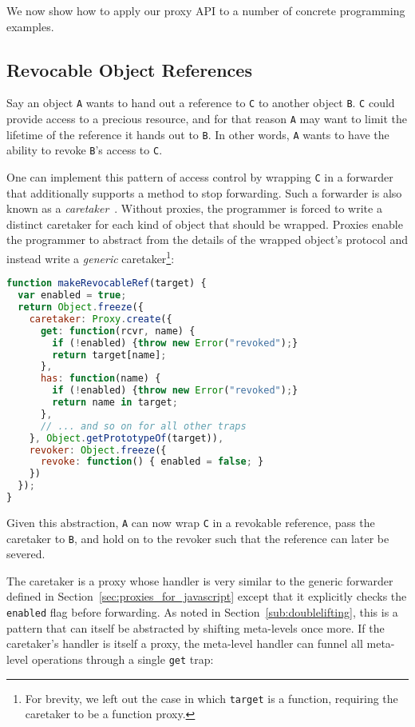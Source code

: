 \documentclass{acm_proc_article-sp}
\begin{document}
We now show how to apply our proxy API to a number of concrete programming examples.

\subsection{Revocable Object References}
\label{sub:revoker}

Say an object \texttt{A} wants to hand out a reference to \texttt{C} to another object \texttt{B}. \texttt{C} could provide access to a precious resource, and for that reason \texttt{A} may want to limit the lifetime of the reference it hands out to \texttt{B}. In other words, \texttt{A} wants to have the ability to revoke \texttt{B}'s access to \texttt{C}.

One can implement this pattern of access control by wrapping \texttt{C} in a forwarder that additionally supports a method to stop forwarding. Such a forwarder is also known as a \emph{caretaker}~\cite{robust_composition}. Without proxies, the programmer is forced to write a distinct caretaker for each kind of object that should be wrapped. Proxies enable the programmer to abstract from the details of the wrapped object's protocol and instead write a \emph{generic} caretaker\footnote{For brevity, we left out the case in which \texttt{target} is a function, requiring the caretaker to be a function proxy.}:

\begin{lstlisting}[language=javascript]
function makeRevocableRef(target) {
  var enabled = true;
  return Object.freeze({
    caretaker: Proxy.create({
      get: function(rcvr, name) {
        if (!enabled) {throw new Error("revoked");}
        return target[name];
      },
      has: function(name) {
        if (!enabled) {throw new Error("revoked");}
        return name in target;      
      },
      // ... and so on for all other traps
    }, Object.getPrototypeOf(target)),
    revoker: Object.freeze({
      revoke: function() { enabled = false; }
    })
  });
}
\end{lstlisting}

Given this abstraction, \texttt{A} can now wrap \texttt{C} in a revokable reference, pass the caretaker to \texttt{B}, and hold on to the revoker such that the reference can later be severed.

The caretaker is a proxy whose handler is very similar to the generic forwarder defined in Section~\ref{sec:proxies_for_javascript} except that it explicitly checks the \texttt{enabled} flag before forwarding. As noted in Section~\ref{sub:doublelifting}, this is a pattern that can itself be abstracted by shifting meta-levels once more. If the caretaker's handler is itself a proxy, the meta-level handler can funnel all meta-level operations through a single \texttt{get} trap:
\end{document}
